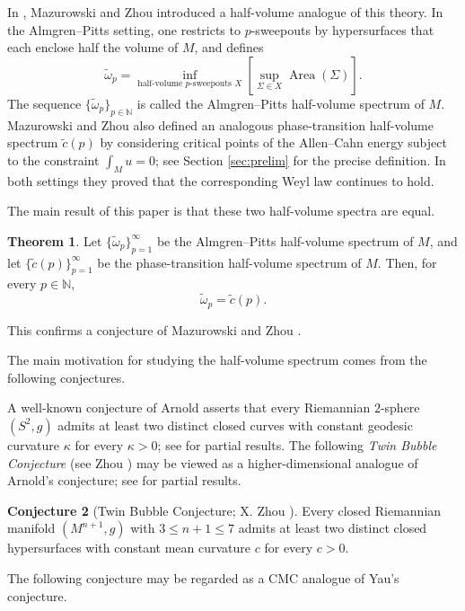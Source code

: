\documentclass[12pt,english]{article}
\theoremstyle{definition}
\newtheorem{theorem}{Theorem}[section]
\newtheorem{conjecture}[theorem]{Conjecture}
\begin{document}
In \cite{ZhouMazur0}, Mazurowski and Zhou introduced a half-volume analogue of this theory. In the Almgren--Pitts setting, one restricts to $p$-sweepouts by hypersurfaces that each enclose half the volume of $M$, and defines
\[
\tilde \omega_p=
\inf_{\text{half-volume $p$-sweepouts }X}
\left[\sup_{\Sigma\in X}\operatorname{Area}(\Sigma)\right].
\]
The sequence $\{\tilde\omega_p\}_{p\in\mathbb N}$ is called the Almgren--Pitts half-volume spectrum of $M$. Mazurowski and Zhou also defined an analogous phase-transition half-volume spectrum $\tilde c(p)$ by considering critical points of the Allen--Cahn energy subject to the constraint $\int_M u = 0$;
see Section \ref{sec:prelim} for the precise definition. In both settings they proved that the corresponding Weyl law continues to hold.

The main result of this paper is that these two half-volume spectra are equal.

\begin{theorem}
Let $\{\tilde\omega_p\}_{p=1}^\infty$ be the Almgren--Pitts half-volume spectrum of $M$, and let $\{\tilde c(p)\}_{p=1}^\infty$ be the phase-transition half-volume spectrum of $M$. Then, for every $p\in\mathbb N$,
\[
\tilde\omega_p=\tilde c(p).
\]
\end{theorem}

This confirms a conjecture of Mazurowski and Zhou \cite{ZhouMazur0}.

The main motivation for studying the half-volume spectrum comes from the following conjectures.

A well-known conjecture of Arnold \cite{arnold2004arnold} asserts that every Riemannian $2$-sphere $(S^2,g)$ admits at least two distinct closed curves with constant geodesic curvature $\kappa$ for every $\kappa>0$; see \cite{AB, CZ, KL, RS, Schneider, SchneiderAlex, ZZ-net} for partial results. The following \emph{Twin Bubble Conjecture} (see Zhou \cite{Zhou-ICM22}) may be viewed as a higher-dimensional analogue of Arnold's conjecture; see \cite{CZ-CMC, Dey23,GMK, Mazurowski22, ZhouMazur3, PX, Torralbo, Ye, ZZ} for partial results.

\begin{conjecture}[Twin Bubble Conjecture; X. Zhou \cite{Zhou-ICM22}]
\label{conj:two-cmcs}
Every closed Riemannian manifold $(M^{n+1},g)$ with $3\le n+1\le 7$ admits at least two distinct closed hypersurfaces with constant mean curvature $c$ for every $c>0$.
\end{conjecture}

The following conjecture may be regarded as a CMC analogue of Yau's conjecture.
\end{document}
